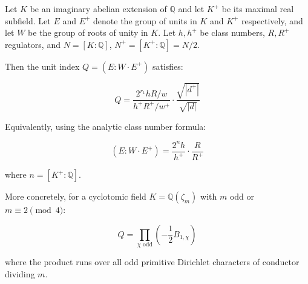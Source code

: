 Let $K$ be an imaginary abelian extension of $\mathbb{Q}$ and let $K^+$ be its maximal real subfield. Let $E$ and $E^+$ denote the group of units in $K$ and $K^+$ respectively, and let $W$ be the group of roots of unity in $K$. Let $h, h^+$ be class numbers, $R, R^+$ regulators, and $N = [K : \mathbb{Q}]$, $N^+ = [K^+ : \mathbb{Q}] = N/2$.

Then the unit index $Q = (E : W \cdot E^+)$ satisfies:

$$Q = \frac{2^{r_1} h R / w}{h^+ R^+ / w^+} \cdot \frac{\sqrt{|d^+|}}{\sqrt{|d|}}$$

Equivalently, using the analytic class number formula:

$$(E : W \cdot E^+) = \frac{2^{n} h}{h^+} \cdot \frac{R}{R^+}$$

where $n = [K^+ : \mathbb{Q}]$.

More concretely, for a cyclotomic field $K = \mathbb{Q}(\zeta_m)$ with $m$ odd or $m \equiv 2 \pmod 4$:

$$Q = \prod_{\chi \text{ odd}} \left( -\frac{1}{2} B_{1,\chi} \right)$$

where the product runs over all odd primitive Dirichlet characters of conductor dividing $m$.
